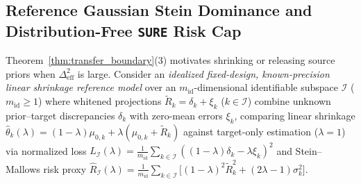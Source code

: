 \subsection{Reference Gaussian Stein Dominance and Distribution-Free \texttt{SURE} Risk Cap}

Theorem~\ref{thm:transfer_boundary}(3) motivates shrinking or releasing source priors when $\Delta_{\mathrm{eff}}^2$ is large. Consider an \emph{idealized fixed-design, known-precision linear shrinkage reference model} over an $m_{\mathrm{id}}$-dimensional identifiable subspace $\mathcal{I}$ ($m_{\mathrm{id}} \ge 1$) where whitened projections $\tilde{R}_k = \delta_k + \xi_k$ ($k \in \mathcal{I}$) combine unknown prior--target discrepancies $\delta_k$ with zero-mean errors $\xi_k$, comparing linear shrinkage $\hat{\theta}_k(\lambda) = (1-\lambda)\mu_{0,k} + \lambda(\mu_{0,k} + \tilde{R}_k)$ against target-only estimation ($\lambda = 1$) via normalized loss $L_{\mathcal{I}}(\lambda) = \frac{1}{m_{\mathrm{id}}}\sum_{k \in \mathcal{I}} ((1 - \lambda)\delta_k - \lambda \xi_k)^2$ and Stein--Mallows risk proxy $\widehat{R}_{\mathcal{I}}(\lambda) = \frac{1}{m_{\mathrm{id}}}\sum_{k \in \mathcal{I}} \big[(1 - \lambda)^2 \tilde{R}_k^2 + (2\lambda - 1)\sigma_k^2\big]$.

